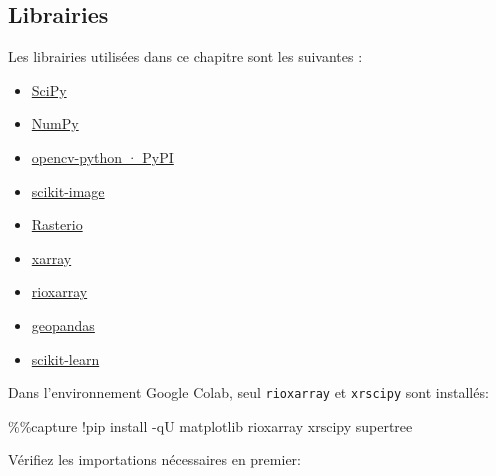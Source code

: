 \documentclass[
  french,
  11pt,
  letterpaper,
  open=any,
  twoside=false,
  french]{scrbook}
\newenvironment{Shaded}{\begin{snugshade}}{\end{snugshade}}
\newcommand{\NormalTok}[1]{\textcolor[rgb]{0.00,0.23,0.31}{#1}}
\newcommand{\OperatorTok}[1]{\textcolor[rgb]{0.37,0.37,0.37}{#1}}
\begin{document}
\subsection{Librairies}\label{librairies-2}

Les librairies utilisées dans ce chapitre sont les suivantes :

\begin{itemize}
\item
  \href{https://scipy.org/}{SciPy}
\item
  \href{https://numpy.org/}{NumPy}
\item
  \href{https://pypi.org/project/opencv-python/}{opencv-python · PyPI}
\item
  \href{https://scikit-image.org/}{scikit-image}
\item
  \href{https://rasterio.readthedocs.io/en/stable/}{Rasterio}
\item
  \href{https://docs.xarray.dev/en/stable/}{xarray}
\item
  \href{https://corteva.github.io/rioxarray/stable/index.html}{rioxarray}
\item
  \href{https://geopandas.org}{geopandas}
\item
  \href{https://scikit-learn.org/}{scikit-learn}
\end{itemize}

Dans l'environnement Google Colab, seul \texttt{rioxarray} et
\texttt{xrscipy} sont installés:

\begin{Shaded}
\begin{Highlighting}[]
\OperatorTok{\%\%}\NormalTok{capture}
\OperatorTok{!}\NormalTok{pip install }\OperatorTok{{-}}\NormalTok{qU matplotlib rioxarray xrscipy supertree}
\end{Highlighting}
\end{Shaded}

Vérifiez les importations nécessaires en premier:
\end{document}
